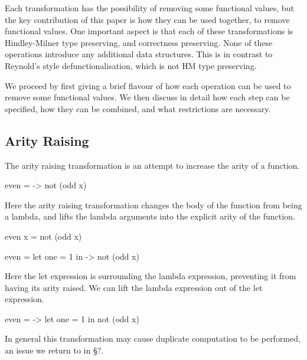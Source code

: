 \documentclass[preprint]{sigplanconf}
\begin{document}
Each transformation has the possibility of removing some functional values, but the key contribution of this paper is how they can be used together, to remove functional values. One important aspect is that each of these transformations is Hindley-Milner type preserving, and correctness preserving. None of these operations introduce any additional data structures. This is in contrast to Reynold's style defunctionalisation, which is not HM type preserving.

We proceed by first giving a brief flavour of how each operation can be used to remove some functional values. We then discuss in detail how each step can be specified, how they can be combined, and what restrictions are necessary.

\subsection{Arity Raising}

The arity raising transformation is an attempt to increase the arity of a function.

\begin{example}
\begin{code}
even = \x -> not (odd x)
\end{code}

Here the arity raising transformation changes the body of the function from being a lambda, and lifts the lambda arguments into the explicit arity of the function.

\begin{code}
even x = not (odd x)
\end{code}
\end{example}

\begin{example}
\begin{code}
even = let one = 1 in \x -> not (odd x)
\end{code}

Here the let expression is surrounding the lambda expression, preventing it from having its arity raised. We can lift the lambda expression out of the let expression.

\begin{code}
even = \x -> let one = 1 in not (odd x)
\end{code}

In general this transformation may cause duplicate computation to be performed, an issue we return to in \S?.
\end{example}
\end{document}
